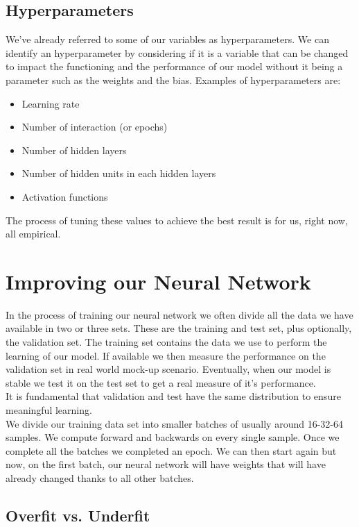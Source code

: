 \documentclass{article}
\begin{document}
\subsection{Hyperparameters}
We've already referred to some of our variables as hyperparameters. We can identify an hyperparameter by considering if it is a variable that can be changed to impact the functioning and the performance of our model without it being a parameter such as the weights and the bias. Examples of hyperparameters are:
\begin{itemize}
    \item Learning rate
    \item Number of interaction (or epochs)
    \item Number of hidden layers
    \item Number of hidden units in each hidden layers
    \item Activation functions
\end{itemize}
The process of tuning these values to achieve the best result is for us, right now, all empirical.

\section{Improving our Neural Network}
In the process of training our neural network we often divide all the data we have available in two or three sets. These are the training and test set, plus optionally, the validation set. The training set contains the data we use to perform the learning of our model. If available we then measure the performance on the validation set in real world mock-up scenario. Eventually, when our model is stable we test it on the test set to get a real measure of it's performance.\\
It is fundamental that validation and test have the same distribution to ensure meaningful learning.\\
We divide our training data set into smaller batches of usually around 16-32-64 samples. We compute forward and backwards on every single sample. Once we complete all the batches we completed an epoch. We can then start again but now, on the first batch, our neural network will have weights that will have already changed thanks to all other batches.

\subsection{Overfit vs. Underfit}
\end{document}
